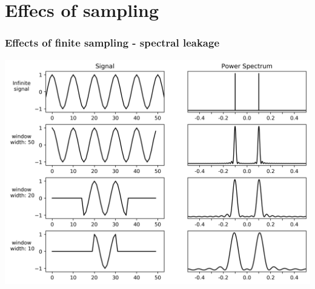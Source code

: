 \documentclass{beamer}
\begin{document}


\section{Effecs of sampling}

\begin{frame}
\frametitle{Effects of finite sampling - spectral leakage}
\begin{center}
\includegraphics[scale=0.55]{Figuras/fig1.jpg}
\end{center}
\end{frame}
\end{document}
